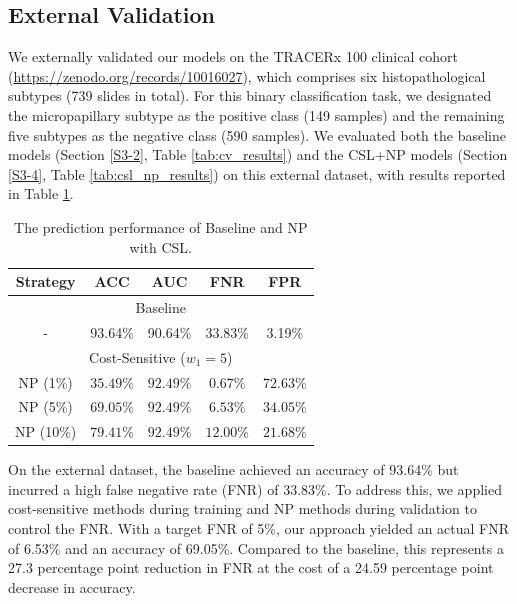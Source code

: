 \documentclass[journal]{IEEEtran}
\theoremstyle{remark}
\begin{document}
\subsection{External Validation}\label{S3-6}

We externally validated our models on the TRACERx 100 clinical cohort (\url{https://zenodo.org/records/10016027}), which comprises six histopathological subtypes (739 slides in total). For this binary classification task, we designated the micropapillary subtype as the positive class (149 samples) and the remaining five subtypes as the negative class (590 samples). We evaluated both the baseline models (Section \ref{S3-2}, Table \ref{tab:cv_results}) and the CSL+NP models (Section \ref{S3-4}, Table \ref{tab:csl_np_results}) on this external dataset, with results reported in Table \ref{tab1}.

\begin{table}[htbp]
    \centering
    \caption{The prediction performance of Baseline and NP with CSL.}
    \label{tab1}
    \renewcommand\arraystretch{1.2} 
    \begin{tabular}{ccccc}
        \toprule
        Strategy & ACC & AUC & FNR & FPR \\
        \midrule
        \multicolumn{5}{c}{Baseline} \\
        \midrule
        - & 93.64\% & 90.64\% & 33.83\% & 3.19\% \\
        \midrule
        \multicolumn{5}{c}{Cost-Sensitive ($w_{1}=5$)} \\
        \midrule
        NP (1\%) & $35.49\%$ & $92.49\%$ & $0.67\%$ & $72.63\%$ \\
        NP (5\%) & $69.05\%$ & $92.49\%$ & $6.53\%$ & $34.05\%$ \\
        NP (10\%) & $79.41\%$ & $92.49\%$ & $12.00\%$ & $21.68\%$ \\
        \bottomrule
    \end{tabular}
    
\end{table}

On the external dataset, the baseline achieved an accuracy of 93.64\% but incurred a high false negative rate (FNR) of 33.83\%. To address this, we applied cost-sensitive methods during training and NP methods during validation to control the FNR. With a target FNR of 5\%, our approach yielded an actual FNR of 6.53\% and an accuracy of 69.05\%. Compared to the baseline, this represents a 27.3 percentage point reduction in FNR at the cost of a 24.59 percentage point decrease in accuracy. 
\end{document}
